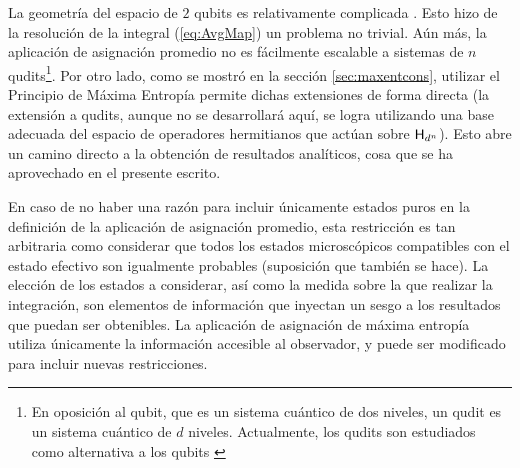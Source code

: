 La geometría del espacio de $2$ qubits es relativamente complicada \cite{JAKOBCZYK}. Esto hizo de la resolución de la integral (\ref{eq:AvgMap}) un problema no trivial. Aún más, la aplicación de asignación promedio no es fácilmente escalable a sistemas de $n$ qudits\footnote{En oposición al qubit, que es un sistema cuántico de dos niveles, un qudit es un sistema cuántico de $d$ niveles. Actualmente, los qudits son estudiados como alternativa a los qubits \cite{qudit}}. Por otro lado, como se mostró en la sección \ref{sec:maxentcons}, utilizar el Principio de Máxima Entropía permite dichas extensiones de forma directa (la extensión a qudits, aunque no se desarrollará aquí, se logra utilizando una base adecuada del espacio de operadores hermitianos que actúan sobre ${\sf H}_{d^{n}}$). Esto abre un camino directo a la obtención de resultados analíticos, cosa que se ha aprovechado en el presente escrito. 

En caso de no haber una razón para incluir únicamente estados puros en la definición de la aplicación de asignación promedio, esta restricción es tan arbitraria como considerar que todos los estados microscópicos compatibles con el estado efectivo son igualmente probables (suposición que también se hace). La elección de los estados a considerar, así como la medida sobre la que realizar la integración, son elementos de información que inyectan un sesgo a los resultados que puedan ser obtenibles. La aplicación de asignación de máxima entropía utiliza únicamente la información accesible al observador, y puede ser modificado para incluir nuevas restricciones. 